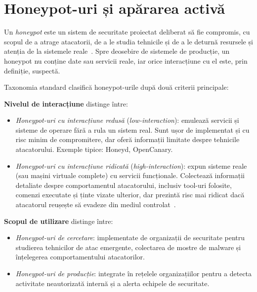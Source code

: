 \section{Honeypot-uri și apărarea activă}

Un \textit{honeypot} este un sistem de securitate proiectat deliberat să fie compromis, cu scopul
de a atrage atacatorii, de a le studia tehnicile și de a le deturnă resursele și atenția de la
sistemele reale~\cite{spitzner2002honeypots}. Spre deosebire de sistemele de producție, un honeypot
nu conține date sau servicii reale, iar orice interacțiune cu el este, prin definiție, suspectă.

Taxonomia standard clasifică honeypot-urile după două criterii principale:

\textbf{Nivelul de interacțiune} distinge între:
\begin{itemize}
  \item \textit{Honeypot-uri cu interacțiune redusă} (\textit{low-interaction}): emulează servicii
    și sisteme de operare fără a rula un sistem real. Sunt ușor de implementat și cu risc minim
    de compromitere, dar oferă informații limitate despre tehnicile atacatorului. Exemple tipice:
    Honeyd, OpenCanary.
  \item \textit{Honeypot-uri cu interacțiune ridicată} (\textit{high-interaction}): expun sisteme
    reale (sau mașini virtuale complete) cu servicii funcționale. Colectează informații detaliate
    despre comportamentul atacatorului, inclusiv tool-uri folosite, comenzi executate și ținte
    vizate ulterior, dar prezintă risc mai ridicat dacă atacatorul reușește să evadeze din
    mediul controlat~\cite{spitzner2002honeypots}.
\end{itemize}

\textbf{Scopul de utilizare} distinge între:
\begin{itemize}
  \item \textit{Honeypot-uri de cercetare}: implementate de organizații de securitate pentru
    studierea tehnicilor de atac emergente, colectarea de mostre de malware și înțelegerea
    comportamentului atacatorilor.
  \item \textit{Honeypot-uri de producție}: integrate în rețelele organizațiilor pentru a detecta
    activitate neautorizată internă și a alerta echipele de securitate.
\end{itemize}

